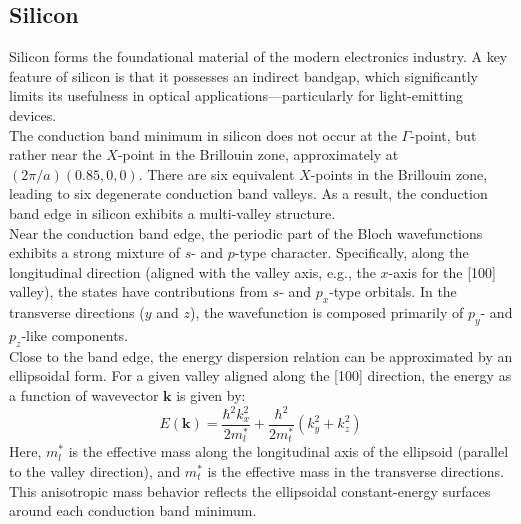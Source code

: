 \subsection{Silicon}
Silicon forms the foundational material of the modern electronics industry. A key feature of silicon is that it possesses an indirect bandgap, which significantly limits its usefulness in optical applications—particularly for light-emitting devices.\\
The conduction band minimum in silicon does not occur at the \( \Gamma \)-point, but rather near the \( X \)-point in the Brillouin zone, approximately at \( (2\pi/a)(0.85, 0, 0) \). There are six equivalent \( X \)-points in the Brillouin zone, leading to six degenerate conduction band valleys. As a result, the conduction band edge in silicon exhibits a multi-valley structure.\\
Near the conduction band edge, the periodic part of the Bloch wavefunctions exhibits a strong mixture of \( s \)- and \( p \)-type character. Specifically, along the longitudinal direction (aligned with the valley axis, e.g., the \( x \)-axis for the [100] valley), the states have contributions from \( s \)- and \( p_x \)-type orbitals. In the transverse directions (\( y \) and \( z \)), the wavefunction is composed primarily of \( p_y \)- and \( p_z \)-like components.\\
Close to the band edge, the energy dispersion relation can be approximated by an ellipsoidal form. For a given valley aligned along the [100] direction, the energy as a function of wavevector \( \mathbf{k} \) is given by:
\begin{equation}
	E(\mathbf{k}) = \frac{\hbar^2 k_x^2}{2 m_l^*} + \frac{\hbar^2}{2 m_t^*} \left( k_y^2 + k_z^2 \right)
\end{equation}
\noindent
Here, \( m_l^* \) is the effective mass along the longitudinal axis of the ellipsoid (parallel to the valley direction), and \( m_t^* \) is the effective mass in the transverse directions. This anisotropic mass behavior reflects the ellipsoidal constant-energy surfaces around each conduction band minimum.
